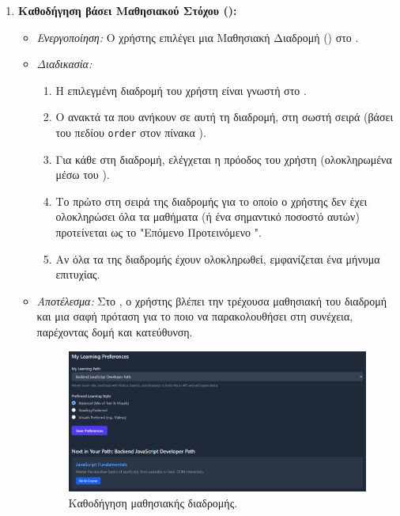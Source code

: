 \begin{enumerate}[leftmargin=*, label=\arabic*., wide, labelwidth=!, labelindent=0pt, itemsep=1ex]
    \item \textbf{Καθοδήγηση βάσει Μαθησιακού Στόχου ():}
        \begin{itemize}[leftmargin=1.5em, noitemsep]
            \item \textit{Ενεργοποίηση:} Ο χρήστης επιλέγει μια Μαθησιακή Διαδρομή (\texttt{}) στο .
            \item \textit{Διαδικασία:}
            \begin{enumerate}[leftmargin=1.5em, label=\alph*), noitemsep]
                \item Η επιλεγμένη διαδρομή του χρήστη είναι γνωστή στο .
                \item Ο  ανακτά τα  που ανήκουν σε αυτή τη διαδρομή, στη σωστή σειρά (βάσει του πεδίου \texttt{order} στον πίνακα \texttt{}).
                \item Για κάθε  στη διαδρομή, ελέγχεται η πρόοδος του χρήστη (ολοκληρωμένα  μέσω του \texttt{}).
                \item Το πρώτο  στη σειρά της διαδρομής για το οποίο ο χρήστης δεν έχει ολοκληρώσει όλα τα μαθήματα (ή ένα σημαντικό ποσοστό αυτών) προτείνεται ως το "Επόμενο Προτεινόμενο ".
                \item Αν όλα τα  της διαδρομής έχουν ολοκληρωθεί, εμφανίζεται ένα μήνυμα επιτυχίας.
            \end{enumerate}
            \item \textit{Αποτέλεσμα:} Στο , ο χρήστης βλέπει την τρέχουσα μαθησιακή του διαδρομή και μια σαφή πρόταση για το ποιο  να παρακολουθήσει στη συνέχεια, παρέχοντας δομή και κατεύθυνση.
            \begin{figure}[h!]
              \centering
              \includegraphics[scale=0.3]{images/learning_path.png}
              \caption{Καθοδήγηση μαθησιακής διαδρομής.}
              \label{fig:dashboard_path_suggestion_placeholder}
            \end{figure}
        \end{itemize}
\end{enumerate}

